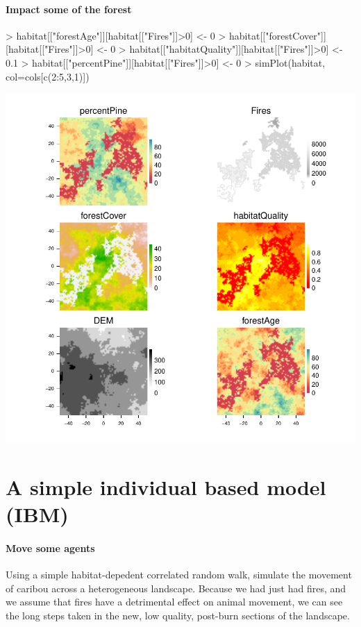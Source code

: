 \documentclass{article}
\begin{document}
\paragraph{Impact some of the forest}
\begin{Schunk}
\begin{Sinput}
> habitat[["forestAge"]][habitat[["Fires"]]>0] <- 0
> habitat[["forestCover"]][habitat[["Fires"]]>0] <- 0
> habitat[["habitatQuality"]][habitat[["Fires"]]>0] <- 0.1
> habitat[["percentPine"]][habitat[["Fires"]]>0] <- 0
> simPlot(habitat, col=cols[c(2:5,3,1)])
\end{Sinput}
\end{Schunk}
\includegraphics{introduction-fire-impacts-maps}

\section{A simple individual based model (IBM)}
\paragraph{Move some agents}
Using a simple habitat-depedent correlated random walk, simulate the movement of caribou across a heterogeneous landscape. Because we had just had fires, and we assume that fires have a detrimental effect on animal movement, we can see the long steps taken in the new, low quality, post-burn sections of the landscape.
\end{document}

